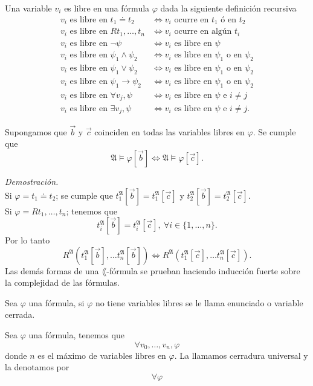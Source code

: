 \begin{definition}
  Una variable $v_i$ es libre en una f\'ormula $\varphi$ dada la siguiente definici\'on recursiva
  \begin{align*}
    v_i \text{ es libre en } t_1 \doteq t_2 &\iff v_i \text{ ocurre en } t_1 \text{ \'o en } t_2\\
    v_i \text{ es libre en } Rt_1, \dots, t_n &\iff v_i \text{ ocurre en alg\'un } t_i\\
    v_i \text{ es libre en } \neg \psi &\iff v_i \text{ es libre en } \psi\\
    v_i \text{ es libre en } \psi_1 \land \psi_2 &\iff v_i \text{ es libre en } \psi_1 \text{ o en } \psi_2\\
    v_i \text{ es libre en } \psi_1 \lor \psi_2 &\iff v_i \text{ es libre en } \psi_1 \text{ o en } \psi_2\\
    v_i \text{ es libre en } \psi_1 \to \psi_2 &\iff v_i \text{ es libre en } \psi_1 \text{ o en } \psi_2\\
    v_i \text{ es libre en } \forall v_j, \psi &\iff v_i \text{ es libre en } \psi \text{ e } i \neq j\\
    v_i \text{ es libre en } \exists v_j, \psi &\iff v_i \text{ es libre en } \psi \text{ e } i \neq j.
  \end{align*}
\end{definition}
\begin{lemma}
  Supongamos que $\vec{b}$ y $\vec{c}$ coinciden en todas las variables libres en $\varphi$.
  Se cumple que
  \[ \mathfrak{A} \models \varphi [\vec{b}] \iff \mathfrak{A} \models \varphi [\vec{c}]. \]
\end{lemma}
\emph{Demostraci\'on.}\\
Si $\varphi = t_1 \doteq t_2$; se cumple que $t_1^{\mathfrak{A}} [\vec{b}] = t_1^{\mathfrak{A}} [\vec{c}]$ y $t_2^{\mathfrak{A}} [\vec{b}] = t_2^{\mathfrak{A}} [\vec{c}]$.\\
Si $\varphi = R t_1, \dots, t_n$; tenemos que 
\[ t_i^{\mathfrak{A}} [\vec{b}] = t_i^{\mathfrak{A}} [\vec{c}], \ \forall i \in \{ 1, \dots, n \}. \]
Por lo tanto 
\[ R^{\mathfrak{A}} (t_1^{\mathfrak{A}} [\vec{b}], \dots t_n^{\mathfrak{A}} [\vec{b}]) \iff R^{\mathfrak{A}} (t_1^{\mathfrak{A}} [\vec{c}], \dots t_n^{\mathfrak{A}} [\vec{c}]). \]
Las dem\'as formas de una $\lang$-f\'ormula se prueban haciendo inducci\'on fuerte sobre la complejidad de las f\'ormulas.
\begin{definition}
  Sea $\varphi$ una f\'ormula, si $\varphi$ no tiene variables libres se le llama enunciado o variable cerrada.
\end{definition}
\begin{definition}
  Sea $\varphi$ una f\'ormula, tenemos que 
  \[ \forall v_0, \dots, v_n, \varphi \]
  donde $n$ es el m\'aximo de variables libres en $\varphi$. 
  La llamamos cerradura universal y la denotamos por
  \[ \forall \varphi \]
\end{definition}
\newpage

